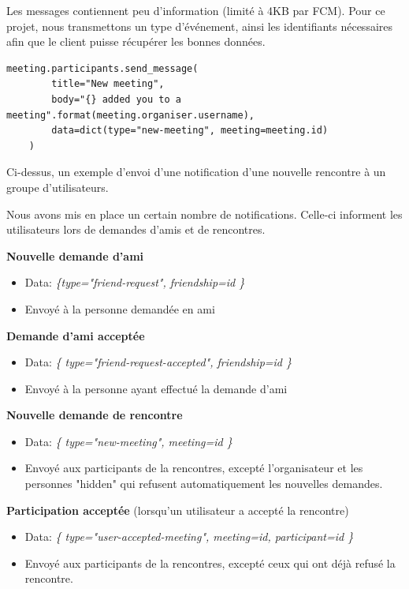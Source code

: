 \documentclass[french]{article}
\begin{document}
	Les messages contiennent peu d'information (limité à 4KB par FCM). Pour ce projet, nous transmettons un type d'événement, ainsi les identifiants nécessaires afin que le client puisse récupérer les bonnes données.
	
	\begin{lstlisting}[style=py]
	meeting.participants.send_message(
		title="New meeting",
		body="{} added you to a meeting".format(meeting.organiser.username),
		data=dict(type="new-meeting", meeting=meeting.id)
	)	
	\end{lstlisting}
	
	Ci-dessus, un exemple d'envoi d'une notification d'une nouvelle rencontre à un groupe d'utilisateurs.
	
	Nous avons mis en place un certain nombre de notifications. Celle-ci informent les utilisateurs lors de demandes d'amis et de rencontres.
	
	\textbf{Nouvelle demande d'ami}
	\begin{itemize}
		\item Data: \emph{\{type="friend-request", friendship=id \}}
		\item Envoyé à la personne demandée en ami
	\end{itemize}
		
	\textbf{Demande d'ami acceptée}
	\begin{itemize}
		\item Data: \emph{\{ type="friend-request-accepted", friendship=id \}}
		\item Envoyé à la personne ayant effectué la demande d'ami
	\end{itemize}
		
	\textbf{Nouvelle demande de rencontre}
	\begin{itemize}
		\item Data: \emph{\{ type="new-meeting", meeting=id \}}
		\item Envoyé aux participants de la rencontres, excepté l'organisateur et les personnes "hidden" qui refusent automatiquement les nouvelles demandes.
	\end{itemize}
		
	\textbf{Participation acceptée} (lorsqu'un utilisateur a accepté la rencontre)
	\begin{itemize}
		\item Data: \emph{\{ type="user-accepted-meeting", meeting=id, participant=id \}}
		\item Envoyé aux participants de la rencontres, excepté ceux qui ont déjà refusé la rencontre.
	\end{itemize}
				
\end{document}
